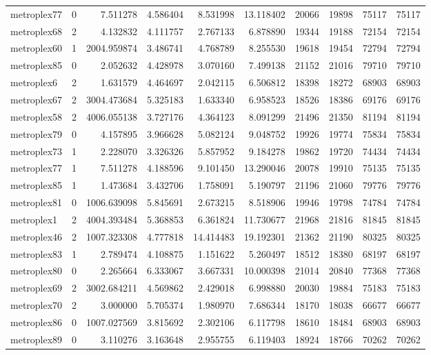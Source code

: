 \begin{longtable}{|l|r|r|r|r|r|r|r|r|r|}
metroplex77 & 0 & 7.511278 & 4.586404 & 8.531998 & 13.118402 & 20066 & 19898 & 75117 & 75117 \\
metroplex68 & 2 & 4.132832 & 4.111757 & 2.767133 & 6.878890 & 19344 & 19188 & 72154 & 72154 \\
metroplex60 & 1 & 2004.959874 & 3.486741 & 4.768789 & 8.255530 & 19618 & 19454 & 72794 & 72794 \\
metroplex85 & 0 & 2.052632 & 4.428978 & 3.070160 & 7.499138 & 21152 & 21016 & 79710 & 79710 \\
metroplex6 & 2 & 1.631579 & 4.464697 & 2.042115 & 6.506812 & 18398 & 18272 & 68903 & 68903 \\
metroplex67 & 2 & 3004.473684 & 5.325183 & 1.633340 & 6.958523 & 18526 & 18386 & 69176 & 69176 \\
metroplex58 & 2 & 4006.055138 & 3.727176 & 4.364123 & 8.091299 & 21496 & 21350 & 81194 & 81194 \\
metroplex79 & 0 & 4.157895 & 3.966628 & 5.082124 & 9.048752 & 19926 & 19774 & 75834 & 75834 \\
metroplex73 & 1 & 2.228070 & 3.326326 & 5.857952 & 9.184278 & 19862 & 19720 & 74434 & 74434 \\
metroplex77 & 1 & 7.511278 & 4.188596 & 9.101450 & 13.290046 & 20078 & 19910 & 75135 & 75135 \\
metroplex85 & 1 & 1.473684 & 3.432706 & 1.758091 & 5.190797 & 21196 & 21060 & 79776 & 79776 \\
metroplex81 & 0 & 1006.639098 & 5.845691 & 2.673215 & 8.518906 & 19946 & 19798 & 74784 & 74784 \\
metroplex1 & 2 & 4004.393484 & 5.368853 & 6.361824 & 11.730677 & 21968 & 21816 & 81845 & 81845 \\
metroplex46 & 2 & 1007.323308 & 4.777818 & 14.414483 & 19.192301 & 21362 & 21190 & 80325 & 80325 \\
metroplex83 & 1 & 2.789474 & 4.108875 & 1.151622 & 5.260497 & 18512 & 18380 & 68197 & 68197 \\
metroplex80 & 0 & 2.265664 & 6.333067 & 3.667331 & 10.000398 & 21014 & 20840 & 77368 & 77368 \\
metroplex69 & 2 & 3002.684211 & 4.569862 & 2.429018 & 6.998880 & 20030 & 19884 & 75183 & 75183 \\
metroplex70 & 2 & 3.000000 & 5.705374 & 1.980970 & 7.686344 & 18170 & 18038 & 66677 & 66677 \\
metroplex86 & 0 & 1007.027569 & 3.815692 & 2.302106 & 6.117798 & 18610 & 18484 & 68903 & 68903 \\
metroplex89 & 0 & 3.110276 & 3.163648 & 2.955755 & 6.119403 & 18924 & 18766 & 70262 & 70262 \\

\end{longtable}
